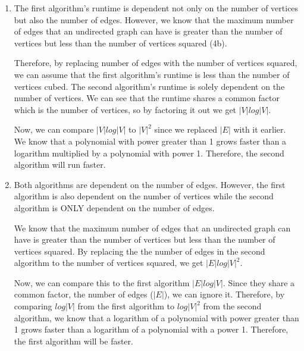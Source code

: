 \documentclass[11pt]{article}
\newenvironment{qparts}{\begin{enumerate}[{(}a{)}]}{\end{enumerate}}
\begin{document}
\begin{qparts}
By definition of even numbers, $\sum_{i = 1}^{|V|}d_{i}$ will always be even.


\item

The first algorithm's runtime is dependent not only on the number of vertices but also the number of edges. However, we know that the maximum number of edges that an undirected graph can have is greater than the number of vertices but less than the number of vertices squared (4b). 

Therefore, by replacing number of edges with the number of vertices squared, we can assume that the first algorithm's runtime is less than the number of vertices cubed. The second algorithm's runtime is solely dependent on the number of vertices. We can see that the runtime shares a common factor which is the number of vertices, so by factoring it out we get $|V|log|V|$. 

Now, we can compare $|V|log|V|$ to $|V|^{2}$ since we replaced $|E|$ with it earlier. We know that a polynomial with power greater than 1 grows faster than a logarithm multiplied by a polynomial with power 1. Therefore, the second algorithm will run faster.


\item
Both algorithms are dependent on the number of edges. However, the first algorithm is also dependent on the number of vertices while the second algorithm is ONLY dependent on the number of edges. 

We know that the maximum number of edges that an undirected graph can have is greater than the number of vertices but less than the number of vertices squared. By replacing the the number of edges in the second algorithm to the number of vertices squared, we get $|E|log|V|^{2}$.

Now, we can compare this to the first algorithm $|E|log|V|$. Since they share a common factor, the number of edges ($|E|$), we can ignore it. Therefore, by comparing $log|V|$ from the first algorithm to $log|V|^{2}$ from the second algorithm, we know that a logarithm of a polynomial with power greater than 1 grows faster than a logarithm of a polynomial with a power 1. Therefore, the first algorithm will be faster. 


\end{qparts}

\newpage
\end{document}
